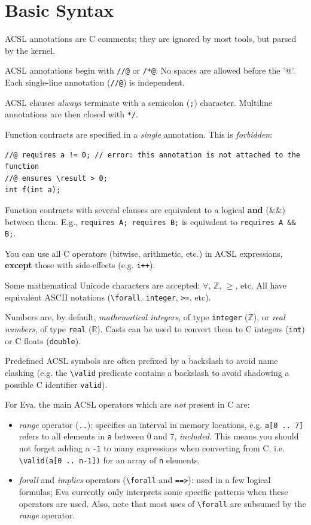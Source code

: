 \documentclass[web]{frama-c-book}
\newcommand{\Eva}{\textsf{Eva}}
\begin{document}
\section{Basic Syntax}

ACSL annotations are C comments; they are ignored by most tools, but parsed
by the \FramaC kernel.

ACSL annotations begin with \texttt{//@} or \texttt{/*@}. No spaces are allowed
before the '@'. Each single-line annotation (\texttt{//@}) is independent.

ACSL clauses {\em always} terminate with a semicolon (\texttt{;}) character.
Multiline annotations are then closed with \texttt{*/}.

Function contracts are specified in a {\em single} annotation.
This is {\em forbidden}:

\begin{lstlisting}
//@ requires a != 0; // error: this annotation is not attached to the function
//@ ensures \result > 0;
int f(int a);
\end{lstlisting}

Function contracts with several clauses are equivalent to a logical
\textbf{and} (\&\&) between them.
E.g., \verb+requires A; requires B;+ is equivalent to \verb+requires A && B;+.

You can use all C operators (bitwise, arithmetic, etc.) in ACSL expressions,
\textbf{except} those with side-effects (e.g. \texttt{i++}).

Some mathematical Unicode characters are accepted:
$\forall$, $\mathbb{Z}$, $\geq$, etc. All have equivalent ASCII notations
(\verb+\forall+, \texttt{integer}, \texttt{>=}, etc).

Numbers are, by default, {\em mathematical integers}, of type \texttt{integer}
(\texttt{$\mathbb{Z}$}), or {\em real numbers}, of type
\texttt{real} (\texttt{$\mathbb{R}$}). Casts can be used to convert them to
C integers (\texttt{int}) or C floats (\texttt{double}).

Predefined ACSL symbols are often prefixed by a backslash to avoid name
clashing (e.g. the \verb+\valid+ predicate contains a
backslash to avoid shadowing a possible C identifier \texttt{valid}).

For \Eva{}, the main ACSL operators which are {\em not} present in C are:

\begin{itemize}
\item {\em range} operator (\texttt{..}): specifies an interval in memory
  locations, e.g. \texttt{a[0 .. 7]} refers to all elements in \texttt{a}
  between 0 and 7, {\em included}. This means you should not forget adding a
  \texttt{-1} to many expressions when converting from C,
  i.e. \verb+\valid(a[0 .. n-1])+ for an array of \texttt{n} elements.
\item {\em forall} and {\em implies} operators (\verb+\forall+
  and \texttt{==>}): used in a few logical formulas; \Eva{} currently only
  interprets some specific patterns when these operators are used.
  Also, note that most uses of \verb+\forall+ are subsumed by the {\em range}
  operator.
\end{itemize}
\end{document}
